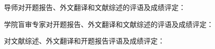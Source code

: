 \cleardoublepage

{
    \bfseries

    {
        \noindent 导师对开题报告、外文翻译和文献综述的评语及成绩评定：
    }


    \vspace{50mm}
    \thesisproposaleval[10][15][5]
    \signature{导师签名}

    {
        \noindent 学院盲审专家对开题报告、外文翻译和文献综述的评语及成绩评定：
    }


    \mbox{} \vfill
    \thesisproposaleval
    \signature{开题报告审核负责人（签名/签章）}
}
{
    \bfseries

    {
        \noindent 对文献综述、外文翻译和开题报告评语及成绩评定：
    }


    \mbox{} \vfill
    \thesisproposaleval
    \signature{开题报告答辩小组负责人（签名）}
}
